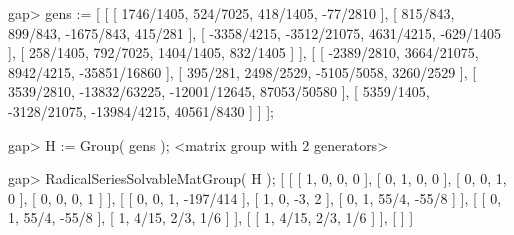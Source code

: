 \endexample


\beginexample
gap> gens := 
[ [ [ 1746/1405, 524/7025, 418/1405, -77/2810 ], 
    [ 815/843, 899/843, -1675/843, 415/281 ],
    [ -3358/4215, -3512/21075, 4631/4215, -629/1405 ],
    [ 258/1405, 792/7025, 1404/1405, 832/1405 ] ],
  [ [ -2389/2810, 3664/21075, 8942/4215, -35851/16860 ],
    [ 395/281, 2498/2529, -5105/5058, 3260/2529 ],
    [ 3539/2810, -13832/63225, -12001/12645, 87053/50580 ],
    [ 5359/1405, -3128/21075, -13984/4215, 40561/8430 ] ] ];

gap> H := Group( gens );
<matrix group with 2 generators>
     
gap> RadicalSeriesSolvableMatGroup( H );
[ [ [ 1, 0, 0, 0 ], [ 0, 1, 0, 0 ], [ 0, 0, 1, 0 ], [ 0, 0, 0, 1 ] ],
  [ [ 0, 0, 1, -197/414 ], [ 1, 0, -3, 2 ], [ 0, 1, 55/4, -55/8 ] ],
  [ [ 0, 1, 55/4, -55/8 ], [ 1, 4/15, 2/3, 1/6 ] ], 
  [ [ 1, 4/15, 2/3, 1/6 ] ],
  [  ] ]

\endexample























